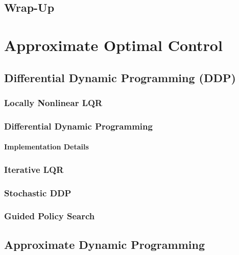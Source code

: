 	\section{Wrap-Up} %

\chapter{Approximate Optimal Control} %

	\section{Differential Dynamic Programming (DDP)} %

		\subsection{Locally Nonlinear LQR} %

		\subsection{Differential Dynamic Programming} %

			\subsubsection{Implementation Details} %

		\subsection{Iterative LQR} %

		\subsection{Stochastic DDP} %

		\subsection{Guided Policy Search} %

	\section{Approximate Dynamic Programming} %

